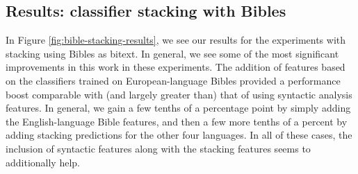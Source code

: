 \subsection{Results: classifier stacking with Bibles}

In Figure \ref{fig:bible-stacking-results}, we see our results for the
experiments with stacking using Bibles as bitext. In general, we see some of
the most significant improvements in this work in these experiments. The
addition of features based on the classifiers trained on European-language
Bibles provided a performance boost comparable with (and largely greater than)
that of using syntactic analysis features. In general, we gain a few tenths of
a percentage point by simply adding the English-language Bible features, and
then a few more tenths of a percent by adding stacking predictions for the
other four languages. In all of these cases, the inclusion of syntactic
features along with the stacking features seems to additionally help.


